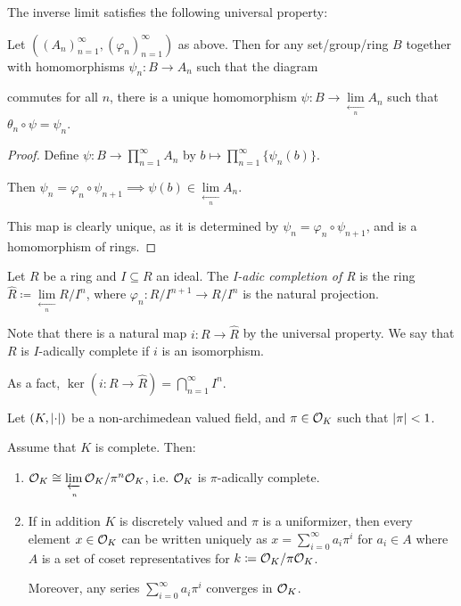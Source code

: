 \documentclass[10pt,a4paper]{article}
\begin{document}
The inverse limit satisfies the following universal property:
\begin{proposition}
  Let $((A_n)_{n=1}^\infty, (\varphi_n)_{n=1}^\infty)$ as above. Then for any set/group/ring $B$ together with homomorphisms $\psi_n : B \to A_n$ such that the diagram
   commutes for all $n$, there is a unique homomorphism $\psi: B \to \lim\limits_{\xleftarrow[n]{}} A_n$ such that $\theta_n \circ \psi = \psi_n$.
\end{proposition}

\begin{proof}
  Define $\psi: B \to \prod_{n=1}^\infty A_n$ by $b \mapsto \prod_{n=1}^\infty \{\psi_n(b)\}$.

  Then $\psi_n = \varphi_n \circ \psi_{n+1} \implies \psi(b) \in \lim\limits_{\xleftarrow[n]{}} A_n$.

  This map is clearly unique, as it is determined by $\psi_n = \varphi_n \circ \psi_{n+1}$, and is a homomorphism of rings.
\end{proof}

\begin{definition}
  Let $R$ be a ring and $I \subseteq R$ an ideal. The \emph{I-adic completion of R} is the ring $\hat{R} \coloneqq \lim\limits_{\xleftarrow[n]{}} R/I^n$, where $\varphi_n : R/I^{n+1} \to R/I^n$ is the natural projection.
\end{definition}

Note that there is a natural map $i:R \to \hat{R}$ by the universal property. We say that $R$ is $I$-adically complete if $i$ is an isomorphism.

As a fact, $\ker(i: R \to \hat{R}) = \bigcap_{n=1}^\infty I^n$.

Let $(K, \lvert\cdot\rvert)$ be a non-archimedean valued field, and $\pi \in \mathcal{O}_K$ such that $\lvert\pi\rvert < 1$.
\begin{proposition}
  Assume that $K$ is complete. Then:
  \begin{enumerate}
    \item $\mathcal{O}_K \cong \lim\limits_{\xleftarrow[n]{}} \mathcal{O}_K/\pi^n\mathcal{O}_K$, i.e. $\mathcal{O}_K$ is $\pi$-adically complete.
    \item If in addition $K$ is discretely valued and $\pi$ is a uniformizer, then every element $x \in \mathcal{O}_K$ can be written uniquely as $x = \sum_{i=0}^\infty a_i \pi^i$ for $a_i \in A$ where $A$ is a set of coset representatives for $k\coloneqq \mathcal{O}_K/\pi\mathcal{O}_K$.

    Moreover, any series $\sum_{i=0}^\infty a_i \pi^i$ converges in $\mathcal{O}_K$.
  \end{enumerate}
\end{proposition}
\end{document}
